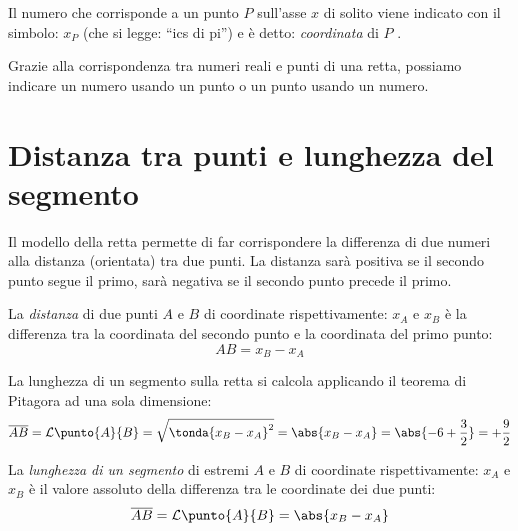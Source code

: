 \vspace{.5em}
Il numero che corrisponde a un punto \(P\) sull'asse \(x\) 
di solito viene indicato con il simbolo: \(x_P\) (che si legge: 
``ics di pi'') e è detto: \emph{coordinata} di \(P\) .

Grazie alla corrispondenza tra numeri reali e punti di una retta, 
possiamo indicare un numero usando un punto o un punto usando un numero.

\section{Distanza tra punti e lunghezza del segmento}
\label{sec:topologiadistanza}

Il modello della retta permette di far corrispondere la differenza di due 
numeri alla distanza (orientata) tra due punti. 
La distanza sarà positiva se il secondo punto segue il primo, sarà negativa 
se il secondo punto precede il primo.

\begin{newdef}{}{}
La \emph{distanza} di due punti \(A\) e \(B\) di coordinate 
rispettivamente:
\(x_A\) e \(x_B\) è la differenza tra la coordinata del secondo punto e la 
coordinata del primo punto: 
\[AB = x_B -x_A\]
\end{newdef}

\vspace{.5em}

\newcommand{\lung}[2]{\mathcal{L}\punto{#1}{#2}}

La lunghezza di un segmento sulla retta si calcola applicando il teorema di 
Pitagora ad una sola dimensione:
\[\overline{AB} = \lung{A}{B} = \sqrt{\tonda{x_B - x_A}^2} = 
  \abs{x_B - x_A} = \abs{-6 + \dfrac{3}{2}} = +\dfrac{9}{2}\]

\begin{newdef}{}{}
La \emph{lunghezza di un segmento} di estremi \(A\) e \(B\) di coordinate 
rispettivamente:
\(x_A\) e \(x_B\) è il valore assoluto della differenza tra le coordinate 
dei due punti: 
\[\overline{AB} = \lung{A}{B} = \abs{x_B -x_A}\]
\end{newdef}

